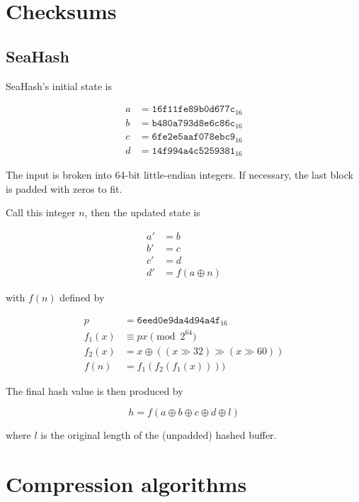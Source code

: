 \documentclass[11pt,a4paper]{report}
\begin{document}
    \section{Checksums}
        \subsection{SeaHash}
        \label{algorithm:seahash}
        SeaHash's initial state is

        \begin{align*}
            a &= \texttt{16f11fe89b0d677c}_{16} \\
            b &= \texttt{b480a793d8e6c86c}_{16} \\
            c &= \texttt{6fe2e5aaf078ebc9}_{16} \\
            d &= \texttt{14f994a4c5259381}_{16}
        \end{align*}

        The input is broken into 64-bit little-endian integers. If necessary,
        the last block is padded with zeros to fit.

        Call this integer $n$, then the updated state is

        \begin{align*}
            a' &= b \\
            b' &= c \\
            c' &= d \\
            d' &= f(a \oplus n)
        \end{align*}

        with $f(n)$ defined by

        \begin{align*}
            p      &=      \texttt{6eed0e9da4d94a4f}_{16} \\
            f_1(x) &\equiv px \pmod{2^{64}} \\
            f_2(x) &=      x \oplus ((x \gg 32) \gg (x \gg 60)) \\
            f(n)   &=      f_1(f_2(f_1(x))))
        \end{align*}

        The final hash value is then produced by

        $$h = f(a \oplus b \oplus c \oplus d \oplus l) $$

        where $l$ is the original length of the (unpadded) hashed buffer.

    \section{Compression algorithms}
\end{document}
